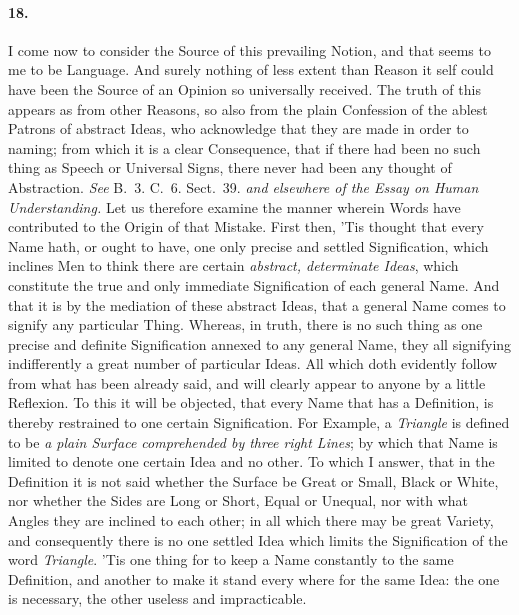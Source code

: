 \documentclass[]{article}
\newenvironment{sectionbody}{}{}
\begin{document}
\begin{sectionbody}
\paragraph{18.} I come now to consider the Source of this prevailing Notion, and
that seems to me to be Language.  And surely nothing of less
extent than Reason it self could have been the Source of an
Opinion so universally received.  The truth of this appears as
from other Reasons, so also from the plain Confession of the
ablest Patrons of abstract Ideas, who acknowledge that they are
made in order to naming; from which it is a clear Consequence,
that if there had been no such thing as Speech or Universal
Signs, there never had been any thought of Abstraction.
\emph{See} B.~3. C.~6. Sect.~39.
\emph{and elsewhere of the Essay on Human Understanding.} Let
us therefore examine the manner wherein Words have contributed to
the Origin of that Mistake.  First then, 'Tis thought that every
Name hath, or ought to have, one only precise and settled
Signification, which inclines Men to think there are certain
\emph{abstract, determinate Ideas}, which constitute the true
and only immediate Signification of each general Name.  And that
it is by the mediation of these abstract Ideas, that a general
Name comes to signify any particular Thing.  Whereas, in truth,
there is no such thing as one precise and definite Signification
annexed to any general Name, they all signifying indifferently a
great number of particular Ideas.  All which doth evidently
follow from what has been already said, and will clearly appear
to anyone by a little Reflexion.  To this it will be objected,
that every Name that has a Definition, is thereby restrained to
one certain Signification.  For Example, a \emph{Triangle} is
defined to be \emph{a plain Surface comprehended by three right
Lines}; by which that Name is limited to denote one certain
Idea and no other.  To which I answer, that in the Definition it
is not said whether the Surface be Great or Small, Black or
White, nor whether the Sides are Long or Short, Equal or Unequal,
nor with what Angles they are inclined to each other; in all
which there may be great Variety, and consequently there is no
one settled Idea which limits the Signification of the word
\emph{Triangle}.  'Tis one thing for to keep a Name constantly
to the same Definition, and another to make it stand every where
for the same Idea: the one is necessary, the other useless and
impracticable.




\end{sectionbody}
\end{document}
